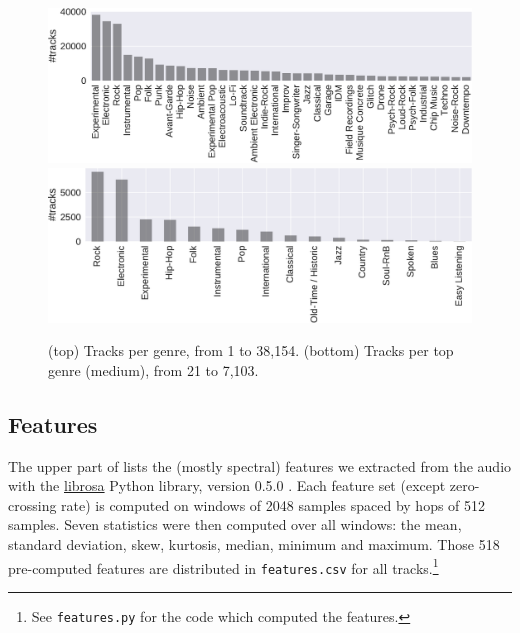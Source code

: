 \documentclass{article}
\begin{document}
\begin{figure}[t]
	\centering
	\includegraphics[width=\linewidth]{genre_distribution.pdf}
	\\ \vspace{1em}
	\includegraphics[width=\linewidth]{genre_top_distribution.pdf}
	\caption{(top) Tracks per genre, from 1 to 38,154.
	(bottom) Tracks per top genre (medium), from 21 to 7,103.}
	\label{fig:genre_distribution}
	\label{fig:genre_top_distribution}
\end{figure}

\subsection{Features} %

The upper part of  lists the (mostly spectral) features we extracted from the audio with the \href{https://github.com/librosa/librosa}{librosa} Python library, version 0.5.0 \cite{librosa}.
Each feature set (except zero-crossing rate) is computed on windows of 2048 samples spaced by hops of 512 samples. Seven statistics were then computed over all windows: the mean, standard deviation, skew, kurtosis, median, minimum and maximum.
Those 518 pre-computed features are distributed in \texttt{features.csv} for all tracks.\footnote{See \texttt{features.py} for the code which computed the features.}
\end{document}
